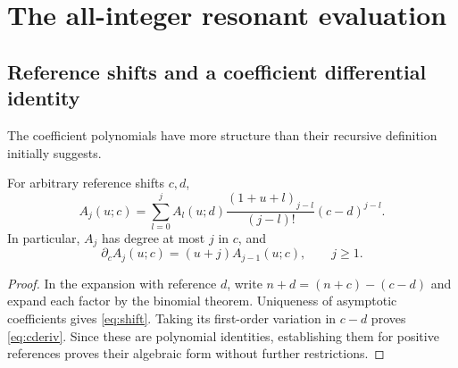 \section{The all-integer resonant evaluation}\label{sec:resonances}

\subsection{Reference shifts and a coefficient differential identity}
The coefficient polynomials have more structure than their recursive
definition initially suggests.

\begin{lemma}\label{lem:shift}
For arbitrary reference shifts $c,d$,
\begin{equation}\label{eq:shift}
 A_j(u;c)=\sum_{l=0}^j A_l(u;d)
 \frac{(1+u+l)_{j-l}}{(j-l)!}(c-d)^{j-l}.
\end{equation}
In particular, $A_j$ has degree at most $j$ in $c$, and
\begin{equation}\label{eq:cderiv}
 \partial_c A_j(u;c)=(u+j)A_{j-1}(u;c),\qquad j\ge1.
\end{equation}
\end{lemma}
\begin{proof}
In the expansion with reference $d$, write
$n+d=(n+c)-(c-d)$ and expand each factor by the binomial theorem.
Uniqueness of asymptotic coefficients gives \eqref{eq:shift}.
Taking its first-order variation in $c-d$ proves \eqref{eq:cderiv}.
Since these are polynomial identities, establishing them for positive
references proves their algebraic form without further restrictions.
\end{proof}

